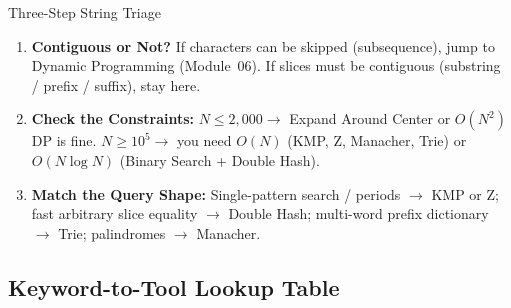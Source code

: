 \documentclass[11pt,a4paper]{article}
\theoremstyle{definition}
\begin{document}
\begin{calloutbox}{Three-Step String Triage}
\begin{enumerate}
    \item \textbf{Contiguous or Not?} If characters can be skipped (subsequence), jump to Dynamic Programming (Module~06). If slices must be contiguous (substring / prefix / suffix), stay here.
    \item \textbf{Check the Constraints:} $N \le 2{,}000 \to$ Expand Around Center or $O(N^2)$ DP is fine. $N \ge 10^5 \to$ you need $O(N)$ (KMP, Z, Manacher, Trie) or $O(N \log N)$ (Binary Search + Double Hash).
    \item \textbf{Match the Query Shape:} Single-pattern search / periods $\to$ KMP or Z; fast arbitrary slice equality $\to$ Double Hash; multi-word prefix dictionary $\to$ Trie; palindromes $\to$ Manacher.
\end{enumerate}
\end{calloutbox}

\subsection*{Keyword-to-Tool Lookup Table}
\end{document}
